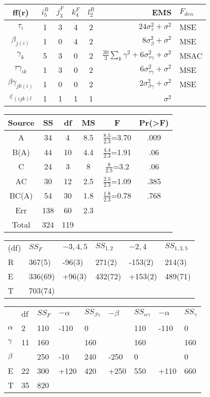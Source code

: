 \documentclass[
  10pt,
  twocolumn]{article}
\begin{document}
\begin{tabular}{c|cccc|r|l}
    ff(r)& $i^R_5$ & $j^F_3$ & $k^F_4$ & $l^R_2$ & EMS & $F_{den}$ \\\hline
    $\tau_i$               & 1 & 3 & 4 & 2 & $24\sigma_\tau^2  + \sigma^2$ & MSE \\
    $\beta_{j(i)}$         & 1 & 0 & 4 & 2 & $8\sigma^2_\beta + \sigma^2$                      & MSE \\
    $\gamma_k$             & 5 & 3 & 0 & 2 & $\frac{30}{3}\sum_k\gamma^2+6\sigma^2_{\tau\gamma}+\sigma^2$ & MSAC\\
    $\tau\gamma_{ik}$      & 1 & 3 & 0 & 2 & $6\sigma^2_{\tau\gamma} + \sigma^2$     & MSE \\
    $\beta\gamma_{jk(i)}$  & 1 & 0 & 0 & 2 & $2\sigma^2_{\beta\gamma} + \sigma^2$              & MSE \\
    $\varepsilon_{(ijk)l}$ & 1 & 1 & 1 & 1 & $\sigma^2$                                      & \\
\end{tabular}
\begin{tabular}{|c|c|c|c|c|c|}\hline
        Source& SS & df & MS & F & Pr(>F) \\\hline
         A    & 34 & 4  & 8.5 & $\frac{8.5}{2.3}$=3.70&.009\\
         B(A) & 44 & 10 & 4.4 & $\frac{4.4}{2.3}$=1.91&.06\\
         C    & 24 & 3  & 8   & $\frac{8}{2.5}$=3.2&.06\\
         AC   & 30 & 12 & 2.5 & $\frac{2.5}{2.3}$=1.09&.385\\
         BC(A)& 54 & 30 & 1.8 & $\frac{1.8}{2.3}$=0.78&.768\\
         Err  & 138& 60 & 2.3 & & \\
         Total& 324& 119& & & \\\hline
\end{tabular}

\begin{tabular}{ l|l|l|l||l|l| }
(df)&$SS_{F}$&$-3,4,5$ &$SS_{1,2}$ &$-2,4$ &$SS_{1,3,5}$\\
R   &367(5) & -96(3) & 271(2) &-153(2) &214(3)\\
E   &336(69)& +96(3) & 432(72)&+153(2) &489(71)\\
T   &  703(74)
\end{tabular}
\begin{tabular}{ |l|l|l|l|l||l|l|l|l }
  & df &$SS_F$ & $-\alpha$ & $SS_{\beta\gamma}$ & $-\beta$ & $SS_{\alpha\gamma}$ & $-\alpha$ & $SS_{\gamma}$\\
$\alpha$&2 &110 &-110 & 0   &      & 110 & -110 & 0\\
$\gamma$&11&160 &     & 160 &      & 160 &      & 160\\
$\beta$&   &250 &-10  & 240 & -250 & 0   &      & 0\\
E      &22 &300 &+120 & 420 & +250 & 550 & +110 & 660\\
T      &35 &820
\end{tabular}
\end{document}

